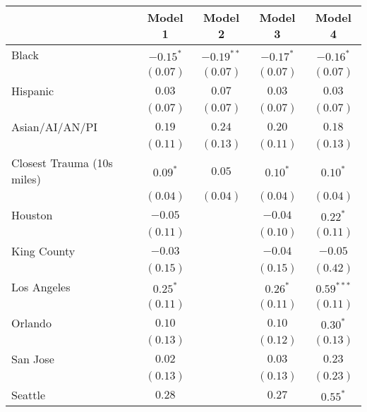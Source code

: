 
\begin{table}[ht!]
\begin{center}
\begin{tabular}{l c c c c}
\toprule
 & Model 1 & Model 2 & Model 3 & Model 4 \\
\midrule
Black                      & $-0.15^{*}$ & $-0.19^{**}$ & $-0.17^{*}$ & $-0.16^{*}$  \\
                           & $(0.07)$    & $(0.07)$     & $(0.07)$    & $(0.07)$     \\
Hispanic                   & $0.03$      & $0.07$       & $0.03$      & $0.03$       \\
                           & $(0.07)$    & $(0.07)$     & $(0.07)$    & $(0.07)$     \\
Asian/AI/AN/PI             & $0.19$      & $0.24$       & $0.20$      & $0.18$       \\
                           & $(0.11)$    & $(0.13)$     & $(0.11)$    & $(0.13)$     \\
Closest Trauma (10s miles) & $0.09^{*}$  & $0.05$       & $0.10^{*}$  & $0.10^{*}$   \\
                           & $(0.04)$    & $(0.04)$     & $(0.04)$    & $(0.04)$     \\
Houston                    & $-0.05$     &              & $-0.04$     & $0.22^{*}$   \\
                           & $(0.11)$    &              & $(0.10)$    & $(0.11)$     \\
King County                & $-0.03$     &              & $-0.04$     & $-0.05$      \\
                           & $(0.15)$    &              & $(0.15)$    & $(0.42)$     \\
Los Angeles                & $0.25^{*}$  &              & $0.26^{*}$  & $0.59^{***}$ \\
                           & $(0.11)$    &              & $(0.11)$    & $(0.11)$     \\
Orlando                    & $0.10$      &              & $0.10$      & $0.30^{*}$   \\
                           & $(0.13)$    &              & $(0.12)$    & $(0.13)$     \\
San Jose                   & $0.02$      &              & $0.03$      & $0.23$       \\
                           & $(0.13)$    &              & $(0.13)$    & $(0.23)$     \\
Seattle                    & $0.28$      &              & $0.27$      & $0.55^{*}$   \\

\end{tabular}
\end{center}
\end{table}
